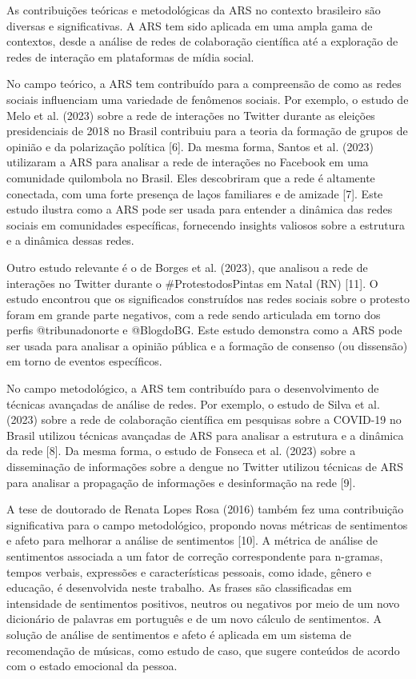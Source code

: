 As contribuições teóricas e metodológicas da ARS no contexto brasileiro são diversas e significativas. A ARS tem sido aplicada em uma ampla gama de contextos, desde a análise de redes de colaboração científica até a exploração de redes de interação em plataformas de mídia social.

No campo teórico, a ARS tem contribuído para a compreensão de como as redes sociais influenciam uma variedade de fenômenos sociais. Por exemplo, o estudo de Melo et al. (2023) sobre a rede de interações no Twitter durante as eleições presidenciais de 2018 no Brasil contribuiu para a teoria da formação de grupos de opinião e da polarização política [6]. Da mesma forma, Santos et al. (2023) utilizaram a ARS para analisar a rede de interações no Facebook em uma comunidade quilombola no Brasil. Eles descobriram que a rede é altamente conectada, com uma forte presença de laços familiares e de amizade [7]. Este estudo ilustra como a ARS pode ser usada para entender a dinâmica das redes sociais em comunidades específicas, fornecendo insights valiosos sobre a estrutura e a dinâmica dessas redes.

Outro estudo relevante é o de Borges et al. (2023), que analisou a rede de interações no Twitter durante o \#ProtestodosPintas em Natal (RN) [11]. O estudo encontrou que os significados construídos nas redes sociais sobre o protesto foram em grande parte negativos, com a rede sendo articulada em torno dos perfis @tribunadonorte e @BlogdoBG. Este estudo demonstra como a ARS pode ser usada para analisar a opinião pública e a formação de consenso (ou dissensão) em torno de eventos específicos.

No campo metodológico, a ARS tem contribuído para o desenvolvimento de técnicas avançadas de análise de redes. Por exemplo, o estudo de Silva et al. (2023) sobre a rede de colaboração científica em pesquisas sobre a COVID-19 no Brasil utilizou técnicas avançadas de ARS para analisar a estrutura e a dinâmica da rede [8]. Da mesma forma, o estudo de Fonseca et al. (2023) sobre a disseminação de informações sobre a dengue no Twitter utilizou técnicas de ARS para analisar a propagação de informações e desinformação na rede [9].

A tese de doutorado de Renata Lopes Rosa (2016) também fez uma contribuição significativa para o campo metodológico, propondo novas métricas de sentimentos e afeto para melhorar a análise de sentimentos [10]. A métrica de análise de sentimentos associada a um fator de correção correspondente para n-gramas, tempos verbais, expressões e características pessoais, como idade, gênero e educação, é desenvolvida neste trabalho. As frases são classificadas em intensidade de sentimentos positivos, neutros ou negativos por meio de um novo dicionário de palavras em português e de um novo cálculo de sentimentos. A solução de análise de sentimentos e afeto é aplicada em um sistema de recomendação de músicas, como estudo de caso, que sugere conteúdos de acordo com o estado emocional da pessoa.

